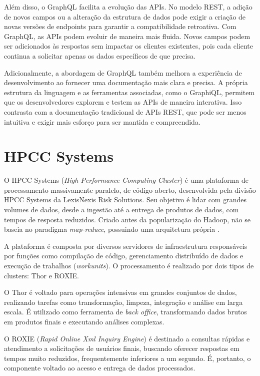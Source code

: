 Além disso, o GraphQL facilita a evolução das APIs. No modelo REST, a adição de novos campos ou a alteração da estrutura de dados pode exigir a criação de novas versões de endpoints para garantir a compatibilidade retroativa. Com GraphQL, as APIs podem evoluir de maneira mais fluida. Novos campos podem ser adicionados às respostas sem impactar os clientes existentes, pois cada cliente continua a solicitar apenas os dados específicos de que precisa.

Adicionalmente, a abordagem de GraphQL também melhora a experiência de desenvolvimento ao fornecer uma documentação mais clara e precisa. A própria estrutura da linguagem e as ferramentas associadas, como o GraphiQL, permitem que os desenvolvedores explorem e testem as APIs de maneira interativa. Isso contrasta com a documentação tradicional de APIs REST, que pode ser menos intuitiva e exigir mais esforço para ser mantida e compreendida.

\section{HPCC Systems}

O HPCC Systems (\textit{High Performance Computing Cluster}) é uma plataforma de processamento massivamente paralelo, de código aberto, desenvolvida pela divisão HPCC Systems da LexisNexis Risk Solutions. Seu objetivo é lidar com grandes volumes de dados, desde a ingestão até a entrega de produtos de dados, com tempos de resposta reduzidos. Criado antes da popularização do Hadoop, não se baseia no paradigma \textit{map-reduce}, possuindo uma arquitetura própria \cite{taylor2022}.

A plataforma é composta por diversos servidores de infraestrutura responsáveis por funções como compilação de código, gerenciamento distribuído de dados e execução de trabalhos (\textit{workunits}). O processamento é realizado por dois tipos de clusters: Thor e ROXIE.

O Thor é voltado para operações intensivas em grandes conjuntos de dados, realizando tarefas como transformação, limpeza, integração e análise em larga escala. É utilizado como ferramenta de \textit{back office}, transformando dados brutos em produtos finais e executando análises complexas.

O ROXIE (\textit{Rapid Online Xml Inquiry Engine}) é destinado a consultas rápidas e atendimento a solicitações de usuários finais, buscando oferecer respostas em tempos muito reduzidos, frequentemente inferiores a um segundo. É, portanto, o componente voltado ao acesso e entrega de dados processados.

